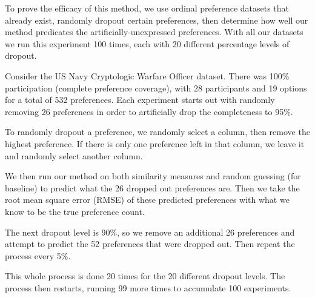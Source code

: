 To prove the efficacy of this method, we use ordinal preference datasets that already exist, randomly dropout certain preferences, then determine how well our method predicates the artificially-unexpressed preferences. With all our datasets we run this experiment 100 times,  each with 20 different percentage levels of dropout. 

Consider the US Navy Cryptologic Warfare Officer dataset. There was 100\% participation (complete preference coverage), with 28 participants and 19 options for a total of 532 preferences.  Each experiment starts out with randomly removing 26 preferences in order to artificially drop the completeness to 95\%. 

To randomly dropout a preference, we randomly select a column, then remove the highest preference. If there is only one preference left in that column, we leave it and randomly select another column. 

We then run our method on both similarity measures and random guessing (for baseline) to predict what the 26 dropped out preferences are. Then we take the root mean square error (RMSE) of these predicted preferences with what we know to be the true preference count. 

The next dropout level is 90\%, so we remove an additional 26 preferences and attempt to predict the 52 preferences that were dropped out. Then repeat the process every 5\%. 

This whole process is done 20 times for the 20 different dropout levels. The process then restarts, running 99 more times to accumulate 100 experiments. 
